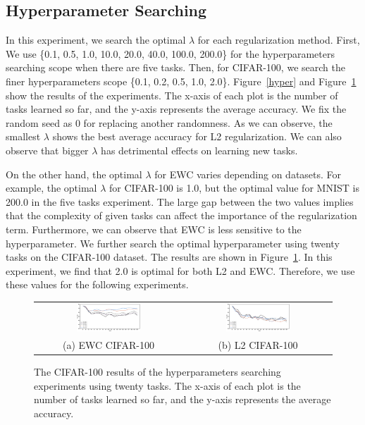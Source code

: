\documentclass[final]{cvpr}
\begin{document}
\subsection{Hyperparameter Searching}\label{hyper_exp}
In this experiment, we search the optimal $\lambda$ for each regularization method. First, We use \{0.1, 0.5, 1.0, 10.0, 20.0, 40.0, 100.0, 200.0\} for the hyperparameters searching scope when there are five tasks. Then, for CIFAR-100, we search the finer hyperparameters scope \{0.1, 0.2, 0.5, 1.0, 2.0\}. Figure~\ref{hyper} and Figure~\ref{hyper2} show the results of the experiments. The x-axis of each plot is the number of tasks learned so far, and the y-axis represents the average accuracy.  We fix the random seed as 0 for replacing another randomness. As we can observe, the smallest $\lambda$ shows the best average accuracy for L2 regularization. We can also observe that bigger $\lambda$ has detrimental effects on learning new tasks.

On the other hand, the optimal $\lambda$ for EWC varies depending on datasets. For example, the optimal $\lambda$ for CIFAR-100 is 1.0, but the optimal value for MNIST is 200.0 in the five tasks experiment. The large gap between the two values implies that the complexity of given tasks can affect the importance of the regularization term. Furthermore, we can observe that EWC is less sensitive to the hyperparameter. We further search the optimal hyperparameter using twenty tasks on the CIFAR-100 dataset. The results are shown in Figure~\ref{hyper2}. In this experiment, we find that 2.0 is optimal for both L2 and EWC. Therefore, we use these values for the following experiments.



\begin{figure}[t]
    \centering
	\begin{tabular}{c@{\hskip0.5cm}c}
		\includegraphics[width=0.45\textwidth]{resources/ewc_shit.eps}&%
        \includegraphics[width=0.45\textwidth]{resources/l2_shit.eps}\\%
        (a) EWC CIFAR-100 & (b) L2 CIFAR-100\\
	\end{tabular}\vspace{0.2cm}
	\caption{The CIFAR-100 results of the hyperparameters searching experiments using twenty tasks. The x-axis of each plot is the number of tasks learned so far, and the y-axis represents the average accuracy.}
    \label{hyper2}
\end{figure}
\end{document}
